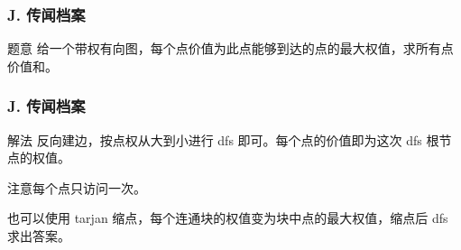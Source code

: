 \renewcommand{\problemname}{J. 传闻档案}

\begin{frame}\frametitle{\problemname}

    \begin{block}{题意}
        给一个带权有向图，每个点价值为此点能够到达的点的最大权值，求所有点价值和。
    \end{block}
\end{frame}

\begin{frame}\frametitle{\problemname}
	\begin{block}{解法}
        反向建边，按点权从大到小进行 dfs 即可。每个点的价值即为这次 dfs 根节点的权值。
        
        注意每个点只访问一次。

        也可以使用 tarjan 缩点，每个连通块的权值变为块中点的最大权值，缩点后 dfs 求出答案。
    \end{block}
\end{frame}